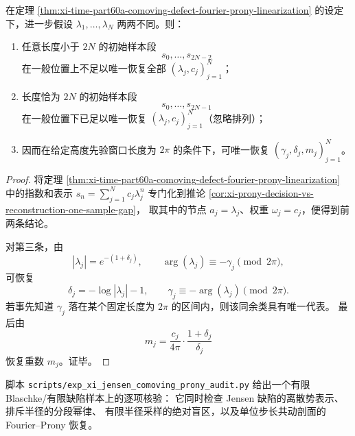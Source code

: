 \begin{corollary}[有限缺陷共动谱的最小完备采样阈值]\label{cor:xi-time-part60a-comoving-defect-minimal-sampling-sharp}
在定理 \ref{thm:xi-time-part60a-comoving-defect-fourier-prony-linearization}
的设定下，进一步假设 \(\lambda_1,\dots,\lambda_N\) 两两不同。则：
\begin{enumerate}
  \item 任意长度小于 \(2N\) 的初始样本段
  \[
  s_0,\dots,s_{2N-2}
  \]
  在一般位置上不足以唯一恢复全部 \((\lambda_j,c_j)_{j=1}^{N}\)；
  \item 长度恰为 \(2N\) 的初始样本段
  \[
  s_0,\dots,s_{2N-1}
  \]
  在一般位置下已足以唯一恢复 \((\lambda_j,c_j)_{j=1}^{N}\)（忽略排列）；
  \item 因而在给定高度先验窗口长度为 \(2\pi\) 的条件下，可唯一恢复
  \((\gamma_j,\delta_j,m_j)_{j=1}^{N}\)。
\end{enumerate}
\end{corollary}
\begin{proof}
将定理 \ref{thm:xi-time-part60a-comoving-defect-fourier-prony-linearization}
中的指数和表示
\(
s_n=\sum_{j=1}^{N}c_j\lambda_j^n
\)
专门化到推论 \ref{cor:xi-prony-decision-vs-reconstruction-one-sample-gap}，
取其中的节点 \(a_j=\lambda_j\)、权重 \(\omega_j=c_j\)，便得到前两条结论。

对第三条，由
\[
|\lambda_j|=e^{-(1+\delta_j)},
\qquad
\arg(\lambda_j)\equiv -\gamma_j\pmod{2\pi},
\]
可恢复
\[
\delta_j=-\log|\lambda_j|-1,
\qquad
\gamma_j\equiv-\arg(\lambda_j)\pmod{2\pi}.
\]
若事先知道 \(\gamma_j\) 落在某个固定长度为 \(2\pi\) 的区间内，则该同余类具有唯一代表。
最后由
\[
m_j=
\frac{c_j}{4\pi}\cdot\frac{1+\delta_j}{\delta_j}
\]
恢复重数 \(m_j\)。证毕。
\end{proof}

\begin{remark}[有限原子审计接口]\label{rem:xi-time-part60a-jensen-comoving-prony-audit}
脚本 \texttt{scripts/exp\_xi\_jensen\_comoving\_prony\_audit.py}
给出一个有限 Blaschke/有限缺陷样本上的逐项核验：
它同时检查 Jensen 缺陷的离散势表示、排斥半径的分段幂律、
有限半径采样的绝对盲区，以及单位步长共动剖面的 Fourier--Prony
恢复。
\end{remark}

\endinput
